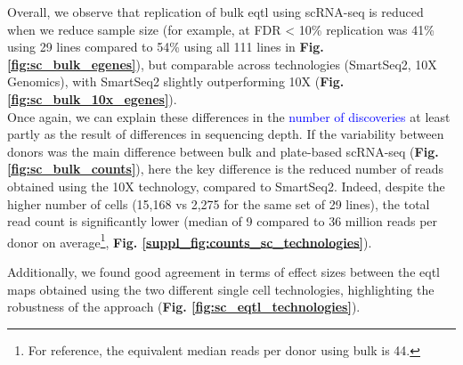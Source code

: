 Overall, we observe that replication of bulk \gls{eqtl} using scRNA-seq is reduced when we reduce sample size (for example, at FDR < 10\% replication was 41\% using 29 lines compared to 54\% using all 111 lines in \textbf{Fig. \ref{fig:sc_bulk_egenes}}), but comparable across technologies (SmartSeq2, 10X Genomics), with SmartSeq2 slightly outperforming 10X (\textbf{Fig. \ref{fig:sc_bulk_10x_egenes}}).
\\

Once again, we can explain these differences in the \textcolor{blue}{number of discoveries} at least partly as the result of differences in sequencing depth.
If the variability between donors was the main difference between bulk and plate-based scRNA-seq (\textbf{Fig. \ref{fig:sc_bulk_counts}}), here the key difference is the reduced number of reads obtained using the 10X technology, compared to SmartSeq2.
Indeed, despite the higher number of cells (15,168 vs 2,275 for the same set of 29 lines), the total read count is significantly lower (median of 9 compared to 36 million reads per donor on average\footnote{For reference, the equivalent median reads per donor using bulk is 44.}, \textbf{Fig. \ref{suppl_fig:counts_sc_technologies}}).

\newpage

Additionally, we found good agreement in terms of effect sizes between the \gls{eqtl} maps obtained using the two different single cell technologies, highlighting the robustness of the approach (\textbf{Fig. \ref{fig:sc_eqtl_technologies}}). \\

